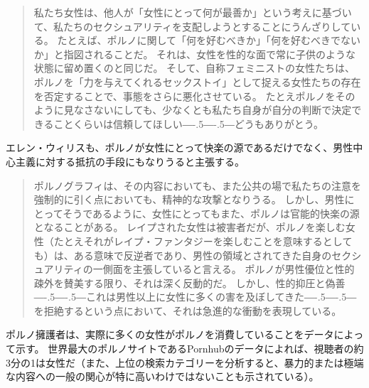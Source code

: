 \documentclass[paper=a4,book,openany]{jlreq}
\def\DDASH{―\kern-.5\zw―\kern-.5\zw―} %
\begin{document}
\begin{quote}
私たち女性は、他人が「女性にとって何が最善か」という考えに基づいて、私たちのセクシュアリティを支配しようとすることにうんざりしている。
たとえば、ポルノに関して「何を好むべきか」「何を好むべきでないか」と指図されることだ。
それは、女性を性的な面で常に子供のような状態に留め置くのと同じだ。
そして、自称フェミニストの女性たちは、ポルノを「力を与えてくれるセックストイ」として捉える女性たちの存在を否定することで、事態をさらに悪化させている。
たとえポルノをそのように見なさないにしても、少なくとも私たち自身が自分の判断で決定できることくらいは信頼してほしい{\DDASH}どうもありがとう。
\citep{clark-flory10}
\end{quote}

エレン・ウィリスも、ポルノが女性にとって快楽の源であるだけでなく、男性中心主義に対する抵抗の手段にもなりうると主張する。

\begin{quote}
ポルノグラフィは、その内容においても、また公共の場で私たちの注意を強制的に引く点においても、精神的な攻撃となりうる。
しかし、男性にとってそうであるように、女性にとってもまた、ポルノは官能的快楽の源となることがある。
レイプされた女性は被害者だが、ポルノを楽しむ女性（たとえそれがレイプ・ファンタジーを楽しむことを意味するとしても）は、ある意味で反逆者であり、男性の領域とされてきた自身のセクシュアリティの一側面を主張していると言える。
ポルノが男性優位と性的疎外を賛美する限り、それは深く反動的だ。
しかし、性的抑圧と偽善{\DDASH}これは男性以上に女性に多くの害を及ぼしてきた{\DDASH}を拒絶するという点において、それは急進的な衝動を表現している。
\citep[pp.83-84]{willis84:_femin_moral_pornog}
\end{quote}

ポルノ擁護者は、実際に多くの女性がポルノを消費していることをデータによって示す。
世界最大のポルノサイトであるPornhubのデータによれば、視聴者の約3分の1は女性だ（また、上位の検索カテゴリーを分析すると、暴力的または極端な内容への一般の関心が特に高いわけではないことも示されている）\citep{insights19:_year_review}。
\end{document}
